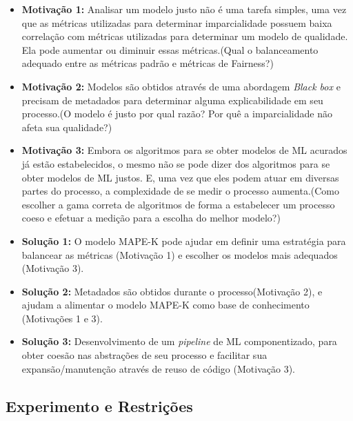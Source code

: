 \documentclass[portugues, 12pt, a4paper]{article}
\begin{document}
\begin{itemize}
\item \textbf{Motivação 1:} Analisar um modelo justo não é uma tarefa simples, uma vez que as métricas utilizadas para determinar imparcialidade possuem baixa correlação com métricas utilizadas para determinar um modelo de qualidade. Ela pode aumentar ou diminuir essas métricas.(Qual o balanceamento adequado entre as métricas padrão e métricas de Fairness?)

\item \textbf{Motivação 2:} Modelos são obtidos através de uma abordagem \textit{Black box} e precisam de metadados para determinar alguma explicabilidade em seu processo.(O modelo é justo por qual razão? Por quê a imparcialidade não afeta sua qualidade?)

\item \textbf{Motivação 3:} Embora os algoritmos para se obter modelos de ML acurados já estão estabelecidos, o mesmo não se pode dizer dos algoritmos para se obter modelos de ML justos. E, uma vez que eles podem atuar em diversas partes do processo, a complexidade de se medir o processo aumenta.(Como escolher a gama correta de algoritmos de forma a estabelecer um processo coeso e efetuar a medição para a escolha do melhor modelo?)

\item \textbf{Solução 1:} O modelo MAPE-K pode ajudar em definir uma estratégia para balancear as métricas (Motivação 1) e escolher os modelos mais adequados (Motivação 3).

\item \textbf{Solução 2:} Metadados são obtidos durante o processo(Motivação 2), e ajudam a alimentar o modelo MAPE-K como base de conhecimento (Motivações 1 e 3).

\item \textbf{Solução 3:} Desenvolvimento de um \textit{pipeline} de ML componentizado, para obter coesão nas abstrações de seu processo e facilitar sua expansão/manutenção através de reuso de código (Motivação 3).
\end{itemize}

\subsection{Experimento e Restrições}
\end{document}
